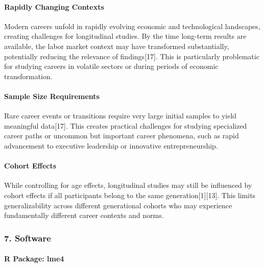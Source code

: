 \documentclass[./main.tex]{subfiles}
\begin{document}
\paragraph{Rapidly Changing
Contexts}\label{rapidly-changing-contexts}

Modern careers unfold in rapidly evolving economic and technological
landscapes, creating challenges for longitudinal studies. By the time
long-term results are available, the labor market context may have
transformed substantially, potentially reducing the relevance of
findings{[}17{]}. This is particularly problematic for studying careers
in volatile sectors or during periods of economic transformation.

\paragraph{Sample Size Requirements}\label{sample-size-requirements}

Rare career events or transitions require very large initial samples to
yield meaningful data{[}17{]}. This creates practical challenges for
studying specialized career paths or uncommon but important career
phenomena, such as rapid advancement to executive leadership or
innovative entrepreneurship.

\paragraph{Cohort Effects}\label{cohort-effects}

While controlling for age effects, longitudinal studies may still be
influenced by cohort effects if all participants belong to the same
generation{[}1{]}{[}13{]}. This limits generalizability across different
generational cohorts who may experience fundamentally different career
contexts and norms.

\subsubsection{7. Software}\label{software}

\paragraph{R Package: lme4}\label{r-package-lme4}
\end{document}
